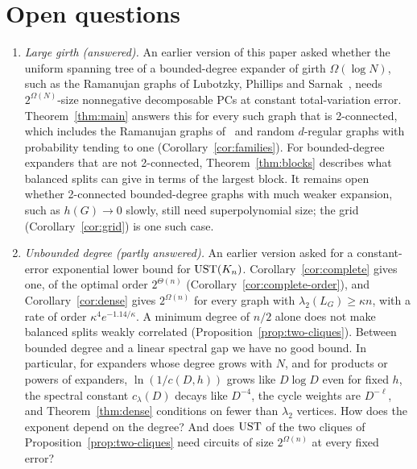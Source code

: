\section{Open questions}\label{sec:open}

\begin{enumerate}
\item \emph{Large girth (answered).} An earlier version of this paper asked whether the uniform spanning tree of a bounded-degree expander of girth $\Omega(\log N)$, such as the Ramanujan graphs of Lubotzky, Phillips and Sarnak~\cite{LPS88}, needs $2^{\Omega(N)}$-size nonnegative decomposable PCs at constant total-variation error. Theorem~\ref{thm:main} answers this for every such graph that is 2-connected, which includes the Ramanujan graphs of~\cite{LPS88} and random $d$-regular graphs with probability tending to one (Corollary~\ref{cor:families}). For bounded-degree expanders that are not 2-connected, Theorem~\ref{thm:blocks} describes what balanced splits can give in terms of the largest block. It remains open whether 2-connected bounded-degree graphs with much weaker expansion, such as $h(G)\to0$ slowly, still need superpolynomial size; the grid (Corollary~\ref{cor:grid}) is one such case.

\item \emph{Unbounded degree (partly answered).} An earlier version asked for a constant-error exponential lower bound for $\mathrm{UST}(K_n)$. Corollary~\ref{cor:complete} gives one, of the optimal order $2^{\Theta(n)}$ (Corollary~\ref{cor:complete-order}), and Corollary~\ref{cor:dense} gives $2^{\Omega(n)}$ for every graph with $\lambda_2(L_G)\ge\kappa n$, with a rate of order $\kappa^4e^{-1.14/\kappa}$. A minimum degree of $n/2$ alone does not make balanced splits weakly correlated (Proposition~\ref{prop:two-cliques}). Between bounded degree and a linear spectral gap we have no good bound. In particular, for expanders whose degree grows with $N$, and for products or powers of expanders, $\ln(1/c(D,h))$ grows like $D\log D$ even for fixed $h$, the spectral constant $c_\lambda(D)$ decays like $D^{-4}$, the cycle weights are $D^{-\ell}$, and Theorem~\ref{thm:dense} conditions on fewer than $\lambda_2$ vertices. How does the exponent depend on the degree? And does $\mathrm{UST}$ of the two cliques of Proposition~\ref{prop:two-cliques} need circuits of size $2^{\Omega(n)}$ at every fixed error?


\end{enumerate}
